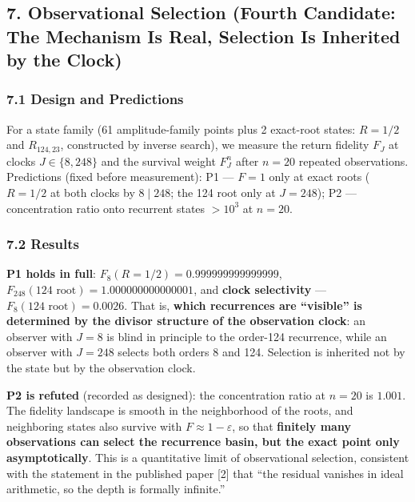 \documentclass[
  a4paper,
]{article}
\begin{document}
\subsection{7. Observational Selection (Fourth Candidate: The Mechanism
Is Real, Selection Is Inherited by the
Clock)}\label{observational-selection-fourth-candidate-the-mechanism-is-real-selection-is-inherited-by-the-clock}

\subsubsection{7.1 Design and Predictions}\label{design-and-predictions}

For a state family (61 amplitude-family points plus 2 exact-root states:
\(R=1/2\) and \(R_{124,23}\), constructed by inverse search), we measure
the return fidelity \(F_J\) at clocks \(J\in\{8,248\}\) and the survival
weight \(F_J^n\) after \(n=20\) repeated observations. Predictions
(fixed before measurement): P1 --- \(F=1\) only at exact roots
(\(R=1/2\) at both clocks by \(8\mid248\); the 124 root only at
\(J=248\)); P2 --- concentration ratio onto recurrent states \(>10^3\)
at \(n=20\).

\subsubsection{7.2 Results}\label{results}

\textbf{P1 holds in full}: \(F_8(R{=}1/2)=0.999999999999999\),
\(F_{248}(\text{124 root})=1.000000000000001\), and \textbf{clock
selectivity} --- \(F_8(\text{124 root})=0.0026\). That is, \textbf{which
recurrences are ``visible'' is determined by the divisor structure of
the observation clock}: an observer with \(J=8\) is blind in principle
to the order-124 recurrence, while an observer with \(J=248\) selects
both orders 8 and 124. Selection is inherited not by the state but by
the observation clock.

\textbf{P2 is refuted} (recorded as designed): the concentration ratio
at \(n=20\) is \(1.001\). The fidelity landscape is smooth in the
neighborhood of the roots, and neighboring states also survive with
\(F\approx1-\varepsilon\), so that \textbf{finitely many observations
can select the recurrence basin, but the exact point only
asymptotically}. This is a quantitative limit of observational
selection, consistent with the statement in the published paper {[}2{]}
that ``the residual vanishes in ideal arithmetic, so the depth is
formally infinite.''
\end{document}
